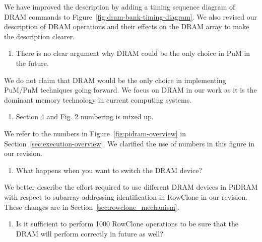 We have improved the description by adding a timing sequence diagram of DRAM commands to Figure~\ref{fig:dram-bank-timing-diagram}. We also revised our description of DRAM operations and their effects on the DRAM array to make the description clearer.

\bigbreak
\begin{tcolorbox}
    \begin{enumerate}[label=R4/\arabic*]
        \addtocounter{enumi}{6}
        \item \label{q:r4q7} There is no clear argument why DRAM could be the only choice in PuM in the future.
    \end{enumerate}
\end{tcolorbox} 

We do not claim that DRAM would be the only choice in implementing PuM/PnM techniques going forward. We focus on DRAM in our work as it is the dominant memory technology in current computing systems.

\bigbreak
\begin{tcolorbox}
    \begin{enumerate}[label=R4/\arabic*]
        \addtocounter{enumi}{7}
        \item \label{q:r4q8} Section 4 and Fig. 2 numbering is mixed up.
    \end{enumerate}
\end{tcolorbox} 

We refer to the numbers in Figure~\ref{fig:pidram-overview} in Section~\ref{sec:execution-overview}. We clarified the use of numbers in this figure in our revision.

\bigbreak
\begin{tcolorbox}
    \begin{enumerate}[label=R4/\arabic*]
        \addtocounter{enumi}{8}
        \item \label{q:r4q9} What happens when you want to switch the DRAM device?
    \end{enumerate}
\end{tcolorbox} 

We better describe the effort required to use different DRAM devices in PiDRAM with respect to subarray addressing identification in RowClone in our revision. These changes are in Section~\ref{sec:rowclone_mechanism}.

\bigbreak
\begin{tcolorbox}
    \begin{enumerate}[label=R4/\arabic*]
        \addtocounter{enumi}{9}
        \item \label{q:r4q10} Is it sufficient to perform 1000 RowClone operations to be sure that the DRAM will perform correctly in future as well?
    \end{enumerate}
\end{tcolorbox} 

